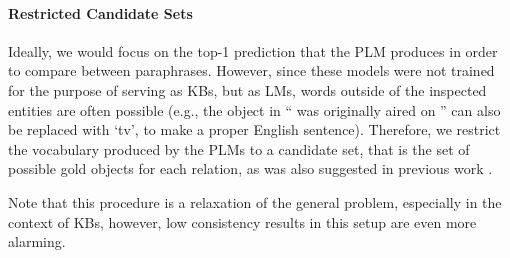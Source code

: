 
\paragraph{Restricted Candidate Sets}
Ideally, we would focus on the top-1 prediction that the PLM produces in order to compare between paraphrases. However, since these models were not trained for the purpose of serving as KBs, but as LMs, words outside of the inspected entities are often possible (e.g., the object in ``\subj{} was originally aired on \obj{}'' can also be replaced with `tv', to make a proper English sentence).
Therefore, we restrict the vocabulary produced by the PLMs to a candidate set, that is the set of possible gold objects for each relation, as was also suggested in previous work \cite{Xiong2020Pretrained, nora@@}.

Note that this procedure is a relaxation of the general problem, especially in the context of KBs, however, low consistency results in this setup are even more alarming.
